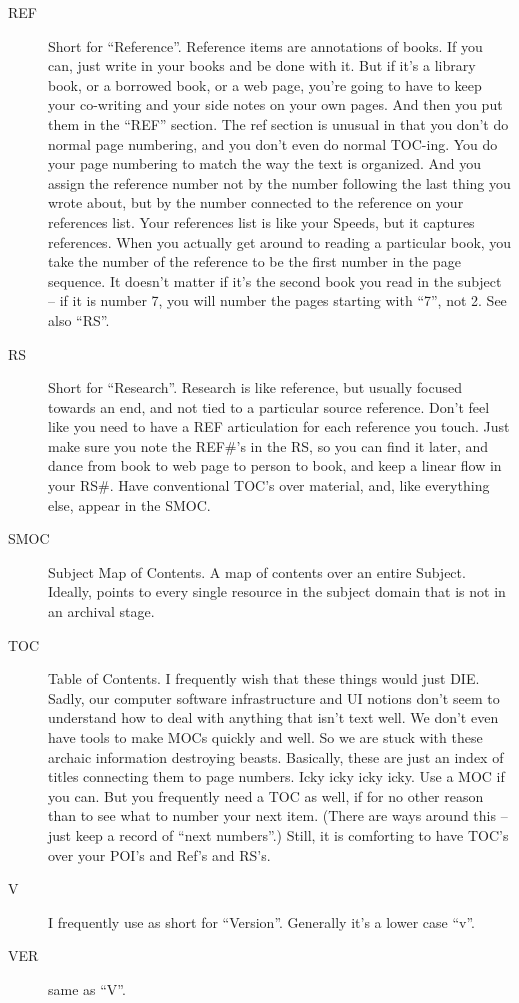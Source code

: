 \documentclass[oneside]{scrbook}
\begin{document}
\begin{description}
\item[REF] Short for ``Reference''. Reference items are annotations of
books. If you can, just write in your books and be done with it. But
if it's a library book, or a borrowed book, or a web page, you're
going to have to keep your co-writing and your side notes on your own
pages. And then you put them in the ``REF'' section. The ref section is
unusual in that you don't do normal page numbering, and you don't even
do normal TOC-ing. You do your page numbering to match the way the
text is organized. And you assign the reference number not by the
number following the last thing you wrote about, but by the number
connected to the reference on your references list. Your references
list is like your Speeds, but it captures references. When you
actually get around to reading a particular book, you take the number of
the reference to be the first number in the page sequence. It doesn't
matter if it's the second book you read in the subject -- if it is
number 7, you will number the pages starting with ``7'', not 2. See also ``RS''.

\item[RS] Short for ``Research''. Research is like reference, but usually
focused towards an end, and not tied to a particular source
reference. Don't feel like you need to have a REF articulation for
each reference you touch. Just make sure you note the REF\#'s in the
RS, so you can find it later, and dance from book to web page to
person to book, and keep a linear flow in your RS\#. Have conventional
TOC's over material, and, like everything else, appear in the SMOC.

\item[SMOC] Subject Map of Contents. A map of contents over an entire
Subject. Ideally, points to every single resource in the subject
domain that is not in an archival stage.

\item[TOC] Table of Contents. I frequently wish that these things would
just DIE. Sadly, our computer software infrastructure and UI notions
don't seem to understand how to deal with anything that isn't text
well. We don't even have tools to make MOCs quickly and well. So we
are stuck with these archaic information destroying beasts. Basically,
these are just an index of titles connecting them to page
numbers. Icky icky icky icky. Use a MOC if you can. But you frequently
need a TOC as well, if for no other reason than to see what to number
your next item. (There are ways around this -- just keep a record of
``next numbers''.) Still, it is comforting to have TOC's over your POI's
and Ref's and RS's.

\item[V] I frequently use as short for ``Version''. Generally it's a lower
case ``v''.

\item[VER] same as ``V''.
\end{description}
\end{document}
